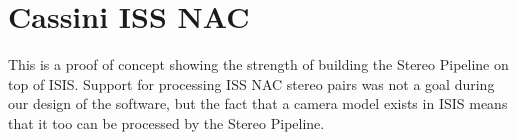 
















\clearpage

\section{Cassini ISS NAC}

This is a proof of concept showing the strength of building the Stereo
Pipeline on top of \ac{ISIS}.  Support for processing ISS NAC stereo pairs
was not a goal during our design of the software, but the fact that a
camera model exists in \ac{ISIS} means that it too can be processed by the
Stereo Pipeline.

